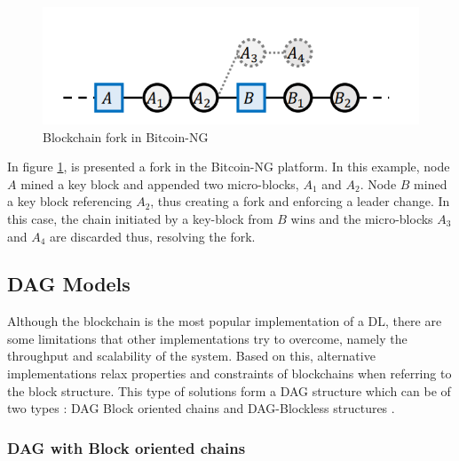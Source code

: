 \begin{figure}[h]
    \centering
    \includegraphics[scale=0.45]{Chapters/Figures/blockchain-fork-bitcoin-ng.png}
    \caption{Blockchain fork in Bitcoin-NG \cite{bitcoin-ng}}
    \label{fig:bitcoin-ng-fork}
\end{figure}

In figure \ref{fig:bitcoin-ng-fork}, is presented a fork in the Bitcoin-NG platform. In this example, node $A$ mined a key block and appended two micro-blocks, $A_1$ and $A_2$. Node $B$ mined a key block referencing $A_2$, thus creating a fork and enforcing a leader change. In this case, the chain initiated by a key-block from $B$ wins and the micro-blocks $A_3$ and $A_4$ are discarded thus, resolving the fork.



\subsection{DAG Models}
\label{subsec:dl_ds:dag}

Although the blockchain is the most popular implementation of a \gls{DL}, there are some limitations that other implementations try to overcome, namely the throughput and scalability of the system. Based on this, alternative implementations %
relax properties and constraints of blockchains when referring to the block structure. This type of solutions form a \gls{DAG} structure which can be of two types \cite{sok}: \gls{DAG} Block oriented chains \cite{spectre_dag, phantom_dag, meshcash, ghost, conflux_dag} and \gls{DAG}-Blockless structures \cite{hashgraph, tangle_iota_dag}.

\subsubsection{DAG with Block oriented chains}


